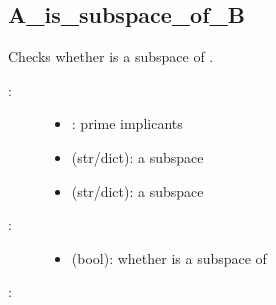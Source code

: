\documentclass[letterpaper,10pt,english]{sphinxmanual}
\begin{document}
\subsection{A\_is\_subspace\_of\_B}
\label{\detokenize{StateTransitionGraphs:a-is-subspace-of-b}}\label{\detokenize{StateTransitionGraphs:id14}}

\begin{fulllineitems}
\label{\detokenize{StateTransitionGraphs:PyBoolNet.StateTransitionGraphs.A_is_subspace_of_B}}
Checks whether  is a subspace of .
\begin{description}
\item[{:}] \leavevmode\begin{itemize}
\item {} 
: prime implicants

\item {} 
 (str/dict): a subspace

\item {} 
 (str/dict): a subspace

\end{itemize}

\item[{:}] \leavevmode\begin{itemize}
\item {} 
 (bool): whether  is a subspace of 

\end{itemize}

\end{description}

:

\begin{sphinxVerbatim}[commandchars=\\\{\}]
  
\end{sphinxVerbatim}

\end{fulllineitems}
\end{document}
